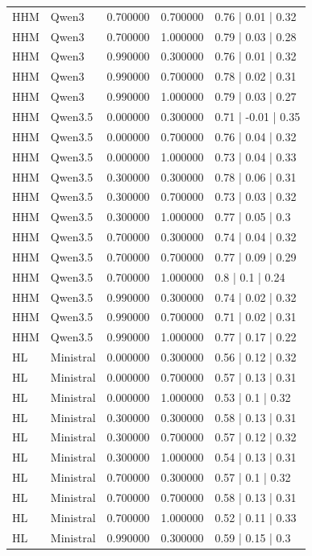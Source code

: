 \begin{longtable}{lllll}
HHM & Qwen3 & 0.700000 & 0.700000 & 0.76 | 0.01 | 0.32 \\
HHM & Qwen3 & 0.700000 & 1.000000 & 0.79 | 0.03 | 0.28 \\
HHM & Qwen3 & 0.990000 & 0.300000 & 0.76 | 0.01 | 0.32 \\
HHM & Qwen3 & 0.990000 & 0.700000 & 0.78 | 0.02 | 0.31 \\
HHM & Qwen3 & 0.990000 & 1.000000 & 0.79 | 0.03 | 0.27 \\
HHM & Qwen3.5 & 0.000000 & 0.300000 & 0.71 | -0.01 | 0.35 \\
HHM & Qwen3.5 & 0.000000 & 0.700000 & 0.76 | 0.04 | 0.32 \\
HHM & Qwen3.5 & 0.000000 & 1.000000 & 0.73 | 0.04 | 0.33 \\
HHM & Qwen3.5 & 0.300000 & 0.300000 & 0.78 | 0.06 | 0.31 \\
HHM & Qwen3.5 & 0.300000 & 0.700000 & 0.73 | 0.03 | 0.32 \\
HHM & Qwen3.5 & 0.300000 & 1.000000 & 0.77 | 0.05 | 0.3 \\
HHM & Qwen3.5 & 0.700000 & 0.300000 & 0.74 | 0.04 | 0.32 \\
HHM & Qwen3.5 & 0.700000 & 0.700000 & 0.77 | 0.09 | 0.29 \\
HHM & Qwen3.5 & 0.700000 & 1.000000 & 0.8 | 0.1 | 0.24 \\
HHM & Qwen3.5 & 0.990000 & 0.300000 & 0.74 | 0.02 | 0.32 \\
HHM & Qwen3.5 & 0.990000 & 0.700000 & 0.71 | 0.02 | 0.31 \\
HHM & Qwen3.5 & 0.990000 & 1.000000 & 0.77 | 0.17 | 0.22 \\
HL & Ministral & 0.000000 & 0.300000 & 0.56 | 0.12 | 0.32 \\
HL & Ministral & 0.000000 & 0.700000 & 0.57 | 0.13 | 0.31 \\
HL & Ministral & 0.000000 & 1.000000 & 0.53 | 0.1 | 0.32 \\
HL & Ministral & 0.300000 & 0.300000 & 0.58 | 0.13 | 0.31 \\
HL & Ministral & 0.300000 & 0.700000 & 0.57 | 0.12 | 0.32 \\
HL & Ministral & 0.300000 & 1.000000 & 0.54 | 0.13 | 0.31 \\
HL & Ministral & 0.700000 & 0.300000 & 0.57 | 0.1 | 0.32 \\
HL & Ministral & 0.700000 & 0.700000 & 0.58 | 0.13 | 0.31 \\
HL & Ministral & 0.700000 & 1.000000 & 0.52 | 0.11 | 0.33 \\
HL & Ministral & 0.990000 & 0.300000 & 0.59 | 0.15 | 0.3 \\

\end{longtable}
